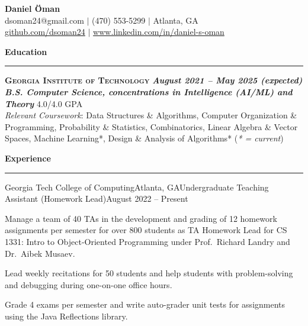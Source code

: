 \documentclass{article}
\newcommand{\horizontal}{\vspace{2pt}\hrule}
\newcommand{\school}[3]{\vspace{2pt}\textsc{\textbf{#1}} \hfill \textbf{\textit{#2}} \\ #3}
\newcommand{\sectitle}[1]{\vspace{3pt} \textbf{\large #1} \horizontal}
\begin{document}
\thispagestyle{empty}
\begin{center}
    \textbf{\LARGE Daniel Öman} \\
    dsoman24@gmail.com $|$ (470) 553-5299 $|$ Atlanta, GA \\
    \href{https://github.com/dsoman24}{github.com/dsoman24} $|$ \href{https://www.linkedin.com/in/daniel-s-oman/}{www.linkedin.com/in/daniel-s-oman}
\end{center}

\begin{flushleft}
\sectitle{Education}

\school{Georgia Institute of Technology}{August 2021 -- May 2025 (expected)}
{\textbf{\textit{B.S. Computer Science, concentrations in Intelligence (AI/ML) and Theory}} \hfill 4.0/4.0 GPA \\ \textit{Relevant Coursework}: Data Structures \& Algorithms, Computer Organization \& Programming, Probability \& Statistics, Combinatorics, Linear Algebra \& Vector Spaces, Machine Learning*, Design \& Analysis of Algorithms* (\textit{* = current})}

\sectitle{Experience}

    \begin{experience}{Georgia Tech College of Computing}{Atlanta, GA}{Undergraduate Teaching Assistant (Homework Lead)}{August 2022 -- Present}
        \item Manage a team of 40 TAs in the development and grading of 12 homework assignments per semester for over 800 students as TA Homework Lead for CS 1331: Intro to Object-Oriented Programming under Prof.~Richard Landry and Dr.~Aibek Musaev.
        \item Lead weekly recitations for 50 students and help students with problem-solving and debugging during one-on-one office hours.
        \item Grade 4 exams per semester and write auto-grader unit tests for assignments using the Java Reflections library.
    \end{experience}


\end{flushleft}
\end{document}
